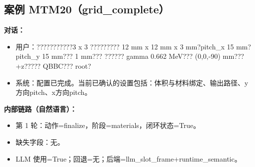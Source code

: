 \documentclass[11pt]{ctexart}
\begin{document}
\subsection{案例 MTM20（grid\_complete）}
\textbf{对话：}
\begin{itemize}
\item 用户：???????????3 x 3 ????????? 12 mm x 12 mm x 3 mm?pitch\_x 15 mm?pitch\_y 15 mm??? 1 mm??? ?????? gamma 0.662 MeV??? (0,0,-90) mm??? +z????? QBBC??? root?
\item 系统：配置已完成。当前已确认的设置包括：体积与材料绑定、输出路径、y方向pitch、x方向pitch。
\end{itemize}
\textbf{内部链路（自然语言）：}
\begin{itemize}
\item 第 1 轮：动作=finalize，阶段=materials，闭环状态=True。
\item 缺失字段：无。
\item LLM 使用=True；回退=无；后端=llm\_slot\_frame+runtime\_semantic。
\end{itemize}
\end{document}
